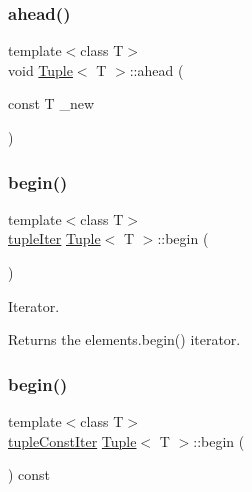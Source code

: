 \mbox{\label{class_tuple_a1173bba1687b01721f9e4e4c73de0d2a}} 
\subsubsection{\texorpdfstring{ahead()}{ahead()}}
{\footnotesize\ttfamily template$<$class T$>$ \\
void \mbox{\hyperlink{class_tuple}{Tuple}}$<$ T $>$\+::ahead (\begin{DoxyParamCaption}\item[{const T}]{\+\_\+new }\end{DoxyParamCaption})\hspace{0.3cm}{\ttfamily [inline]}}

\mbox{\label{class_tuple_a205dfb3c3dcad03ced830b5c9687d225}} 
\subsubsection{\texorpdfstring{begin()}{begin()}\hspace{0.1cm}{\footnotesize\ttfamily [1/2]}}
{\footnotesize\ttfamily template$<$class T$>$ \\
\mbox{\hyperlink{maths_8hh_ad22dcdeefda7d41523cc1604953eb6cc}{tuple\+Iter}} \mbox{\hyperlink{class_tuple}{Tuple}}$<$ T $>$\+::begin (\begin{DoxyParamCaption}{ }\end{DoxyParamCaption})\hspace{0.3cm}{\ttfamily [inline]}}



Iterator. 

\begin{DoxyReturn}{Returns}
the elements.\+begin() iterator. 
\end{DoxyReturn}
\mbox{\label{class_tuple_ab5d618dac69995db6adb0e657cd73bb3}} 
\subsubsection{\texorpdfstring{begin()}{begin()}\hspace{0.1cm}{\footnotesize\ttfamily [2/2]}}
{\footnotesize\ttfamily template$<$class T$>$ \\
\mbox{\hyperlink{maths_8hh_a2eba794860251c1b30e532df32ee4d1b}{tuple\+Const\+Iter}} \mbox{\hyperlink{class_tuple}{Tuple}}$<$ T $>$\+::begin (\begin{DoxyParamCaption}{ }\end{DoxyParamCaption}) const\hspace{0.3cm}{\ttfamily [inline]}}



